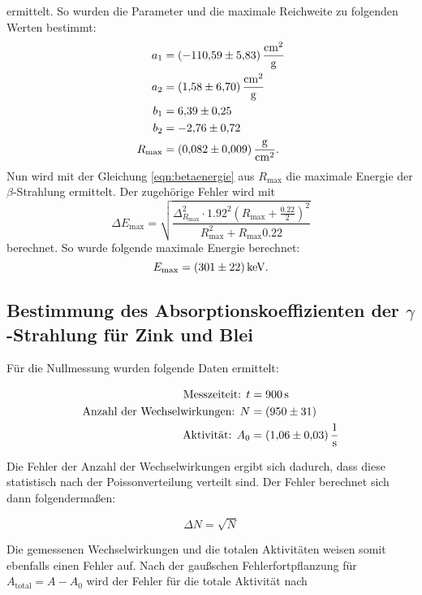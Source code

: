 ermittelt.
So wurden die Parameter und die maximale Reichweite zu folgenden Werten bestimmt:
\begin{align*}
  a_1 &= \SI{-110.59\pm5.83}{\centi\metre\squared\per\gram} \\
  a_2 &= \SI{1.58\pm6.70}{\centi\metre\squared\per\gram} \\
  b_1 &= \num{6.39\pm0.25} \\
  b_2 &= \num{-2.76\pm0.72} \\
  R_\text{max} &= \SI{0.082\pm0.009}{\gram\per\centi\metre\squared} .
\end{align*}
Nun wird mit der Gleichung \eqref{eqn:betaenergie} aus $R_\text{max}$ die maximale Energie der $\beta$-Strahlung ermittelt.
Der zugehörige Fehler wird mit
\begin{equation*}
  \Delta E_\text{max}= \sqrt{\frac{\Delta_{R_{\text{max}}}^{2} \cdot {1.92}^{2} \left(R_{\text{max}} + \frac{{0.22}}{2}\right)^{2}}{R_{\text{max}}^{2} + R_{\text{max}} {0.22}}}
\end{equation*}
berechnet.
So wurde folgende maximale Energie berechnet:
\begin{equation*}
  E_\text{max} = \SI{301\pm22}{\kilo\electronvolt}.
\end{equation*}

\subsection{Bestimmung des Absorptionskoeffizienten der \texorpdfstring{$\gamma$}{Gamma}-Strahlung für Zink und Blei}

Für die Nullmessung wurden folgende Daten ermittelt:

\begin{align*}
  \text{Messzeiteit: } t &= \SI{900}{\second} \\
  \text{Anzahl der Wechselwirkungen: } N &= (950 \pm 31) \\
  \text{Aktivität: } A_0 &= \SI{1.06 \pm 0.03}{\per\second}
\end{align*}

Die Fehler der Anzahl der Wechselwirkungen ergibt sich dadurch, dass diese statistisch nach der Poissonverteilung verteilt sind.
Der Fehler berechnet sich dann folgendermaßen:

\begin{equation}
  \Delta N = \sqrt{N}
\end{equation}

Die gemessenen Wechselwirkungen und die totalen Aktivitäten weisen somit ebenfalls einen Fehler auf.
Nach der gaußschen Fehlerfortpflanzung für $A_\text{total} = A - A_0$ wird der Fehler für die totale Aktivität nach


